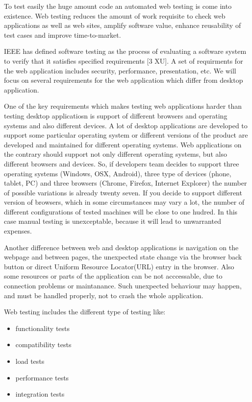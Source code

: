 	 	 To test easily the huge amount code an automated web testing is come into
	 	 existence.	 Web testing reduces the amount of work requisite to check web
	 	 applications as well as web sites, amplify software value, enhance
	 	 reusability of test cases and improve time-to-market.
	   
		IEEE has defined software testing as the process of evaluating a software
		system to verify that it satisfies specified requirements [3 XU]. A set of
		requirments for the web application includes security, performance,
		presentation, etc. We will focus on several requirements for the web
		application which differ from desktop application. 
		
		One of the key requirements which makes testing web applications harder than
		testing desktop applicatiosn is support of different browsers and operating systems and also
		different devices. A lot of desktop applications are developed to support some
		particular operating system or different versions of the product are developed
		and maintained for different operating systems. Web applications on the
		contrary should support not only different operating systems, but also
		different browsers and devices. So, if developers team decides to support
		three operating systems (Windows, OSX, Android), three type of devices (phone,
		tablet, PC) and three browsers (Chrome, Firefox, Internet Explorer) the number
		of possible variations is already twenty seven. If you decide to support
		different version of browsers, which in some circumstances may vary a lot,
		the number of different configurations of tested machines will be close to
		one hudred. In this case manual testing is unexceptable, because it will lead
		to unwarranted expenses. 
		
		Another difference between web and desktop applications is
		navigation on the webpage and between pages, the unexpected state change via
		the browser back button or direct Uniform Resource Locator(URL) entry in the
		browser. Also some resources or parts of the application can be not acccessable, due to
		connection problems or maintanance. Such unexpected behaviour may happen, and
		must be handled properly, not to crash the whole application.

		Web testing includes the different type of testing like:
		\begin{itemize}
		  \item functionality tests
		  \item compatibility tests
		  \item load tests
		  \item performance tests
		  \item integration tests
		\end{itemize}

